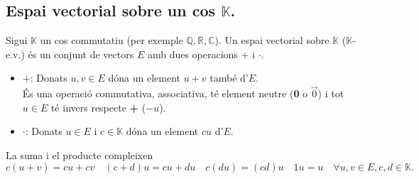 \documentclass[11pt]{article}
\newcommand{\fieldk}{\mathbb{K}}
\begin{document}
\subsection{Espai vectorial sobre un cos $\fieldk$.}
Sigui $\mathbb{K}$ un cos commutatiu (per exemple $\mathbb{Q},\mathbb{R},\mathbb{C}$). Un espai vectorial sobre $\mathbb{K}$ ($\mathbb{K}$-e.v.) és un conjunt de vectors $E$ amb dues operacions $+$ i $\cdot$.
\begin{itemize}
	\item $\textbf{+}$: Donats $u,v\in E$ dóna un element $u+v$ també d'$E$.\\ És una operació commutativa, associativa, té element neutre (\textbf{0} o $\vec{0}$) i tot $u\in E$ té invers respecte \textbf{+} ($-u$).
	\item $\textbf{·}$: Donats $u\in E$ i $c\in\mathbb{K}$ dóna un element $cu$ d'$E$.
\end{itemize}
La suma i el producte compleixen
$$c(u+v)=cu+cv \quad (c+d)u=cu+du \quad c(du)=(cd)u \quad 1u=u \quad \forall u,v\in E, c,d\in\mathbb{K}.$$

\newpage
\end{document}
